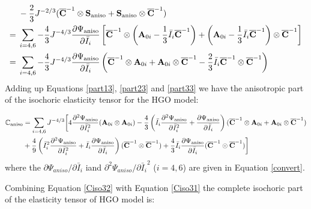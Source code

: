 \begin{equation} \label{part33}
\begin{split}
&-\frac{2}{3}J^{-2/3}({\overline{\bold{C}}}^{-1} \otimes \bold{S}_\mathrm{aniso} + \bold{S}_\mathrm{aniso} \otimes {\overline{\bold{C}}}^{-1}) \\
= {} &
\sum_{i = 4, 6} -\frac{4}{3}J^{-4/3}\frac{\partial\Psi_\mathrm{aniso}}{\partial\bar{I}_i}
\left[ \overline{\bold{C}}^{-1} \otimes \left( \bold{A}_{0i} - \frac{1}{3}\bar{I}_i \overline{\bold{C}}^{-1} \right)
+ \left( \bold{A}_{0i} - \frac{1}{3}\bar{I}_i \overline{\bold{C}}^{-1} \right) \otimes \overline{\bold{C}}^{-1} \right] \\
= {} & \sum_{i = 4, 6} -\frac{4}{3}J^{-4/3}\frac{\partial\Psi_\mathrm{aniso}}{\partial\bar{I}_i}
\left( \overline{\bold{C}}^{-1} \otimes \bold{A}_{0i} + \bold{A}_{0i} \otimes \overline{\bold{C}}^{-1} 
- \frac{2}{3} \bar{I}_i \overline{\bold{C}}^{-1} \otimes \overline{\bold{C}}^{-1} \right) \\
\end{split}
\end{equation}
Adding up Equations \ref{part13}, \ref{part23} and \ref{part33} we have the anisotropic part of the isochoric elasticity tensor for the HGO model:

\begin{equation} \label{Ciso31}
\begin{split}
\mathbb{C}_\mathrm{aniso} 
&= \sum_{i = 4, 6} J^{-4/3} \bigg[ 4\frac{\partial^2\Psi_\mathrm{aniso}}{\partial{\bar{I}_i}^2} (\bold{A}_{0i} \otimes \bold{A}_{0i}) - \frac{4}{3} \left( \bar{I}_i\frac{\partial^2\Psi_\mathrm{aniso}}{\partial{\bar{I}_i}^2} + \frac{\partial\Psi_\mathrm{aniso}}{\partial{\bar{I}_i}} \right) (\overline{\bold{C}}^{-1} \otimes \bold{A}_{0i} + \bold{A}_{0i} \otimes \overline{\bold{C}}^{-1}) \\
&+ \frac{4}{9} \left( {\bar{I}_i}^2\frac{\partial^2\Psi_\mathrm{aniso}}{\partial{\bar{I}_i}^2} + \bar{I}_i\frac{\partial\Psi_\mathrm{aniso}}{\partial{\bar{I}_i}} \right) (\overline{\bold{C}}^{-1} \otimes \overline{\bold{C}}^{-1}) 
+ \frac{4}{3}\bar{I}_i \frac{\partial\Psi_\mathrm{aniso}}{\partial{\bar{I}_i}}( \overline{\bold{C}}^{-1} \odot \overline{\bold{C}}^{-1}) \bigg]
\end{split}
\end{equation}
where the $\partial\Psi_{aniso}/\partial{\bar{I}_i}$ iand $\partial^2\Psi_{aniso}/{\partial{\bar{I}_i}^2}$ ($i = 4, 6$) are given in Equation \ref{convert}.

Combining Equation \ref{Ciso32} with Equation \ref{Ciso31} the complete isochoric part of the elasticity tensor of HGO model is:

